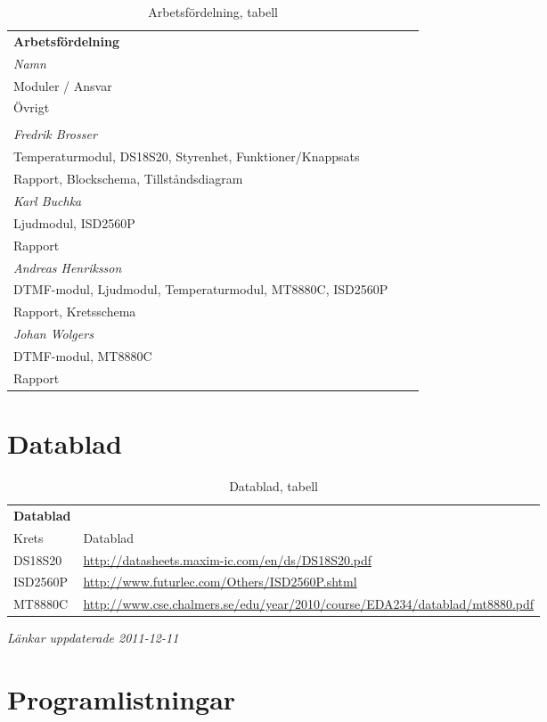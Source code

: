 \documentclass[a4paper,11pt]{article}
\begin{document}
	\begin{table} [H]
	\caption{Arbetsfördelning, tabell} 
	\label{tab:arbetsTabell}

		\begin{tabular}{l l l}
		{\bf Arbetsfördelning}
		
		\\{\it Namn} \\ {Moduler / Ansvar} \\ {Övrigt}\\\\
		\hline
				{\it Fredrik Brosser}\\
				 Temperaturmodul, DS18S20, Styrenhet, Funktioner/Knappsats\\
				 Rapport, Blockschema, Tillståndsdiagram\\
				{\it Karl Buchka}\\
				 Ljudmodul, ISD2560P\\
				 Rapport\\
				{\it Andreas Henriksson}\\
				 DTMF-modul, Ljudmodul, Temperaturmodul, MT8880C, ISD2560P\\
				 Rapport, Kretsschema\\
				{\it Johan Wolgers}\\
				 DTMF-modul, MT8880C\\
				 Rapport\\
		\end{tabular}
	\end{table}
\pagebreak
	\section{Datablad}
	
	\label{sec:datablad}
	
	\begin{table} [H]
	\caption{Datablad, tabell} 
	\label{tab:databladsTabell}

		\begin{tabular}{l l}
		{\bf Datablad}
		\\{Krets} & {Datablad}\\
		\hline
			DS18S20 	& {\small \url{http://datasheets.maxim-ic.com/en/ds/DS18S20.pdf}}\\
			ISD2560P 	& {\small \url{http://www.futurlec.com/Others/ISD2560P.shtml}}\\
			MT8880C 	& {\small \url{http://www.cse.chalmers.se/edu/year/2010/course/EDA234/datablad/mt8880.pdf}}\\
		\end{tabular}
		{\it Länkar uppdaterade 2011-12-11}
	\end{table}

\pagebreak

	\section{Programlistningar}
	\label{sec:programlistningar}	
		
		
		
		
		
		
\end{document}
